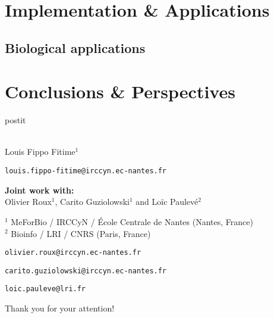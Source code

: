 \documentclass[fleqn,10pt,c]{beamer}
\begin{document}
\section{Implementation \& Applications}

%

\subsection{Biological applications}



\section{Conclusions \& Perspectives}

%

\begin{frame}[plain,label=title]

\begin{center}
\vspace{1cm}
\begin{beamercolorbox}[sep=0.5em]{postit}
\centering
\Large
\textbf{%
{\normalsize\theconference{}}\\~\\%
\inserttitle
}
\end{beamercolorbox}

\par
\medskip
\normalsize
Louis Fippo Fitime$^{1}$
\footnotesize

\texttt{louis.fippo-fitime@irccyn.ec-nantes.fr}


\normalsize
\bigskip
\textbf{Joint work with:} \\  Olivier Roux$^1$, Carito Guziolowski$^1$ and Lo\"ic Paulev\'e$^2$

\medskip
\footnotesize
$^1$ MeForBio / IRCCyN / École Centrale de Nantes (Nantes, France)\\
$^2$ Bioinfo / LRI / CNRS (Paris, France)

\texttt{olivier.roux@irccyn.ec-nantes.fr}

\texttt{carito.guziolowski@irccyn.ec-nantes.fr}

\texttt{loic.pauleve@lri.fr}

\end{center}
Thank you for your attention!
\end{frame}
\end{document}
